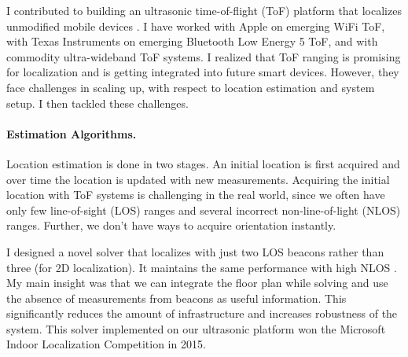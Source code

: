 \documentclass[10pt]{article}
\begin{document}
I contributed to building an ultrasonic time-of-flight (ToF) platform that localizes unmodified mobile devices \cite{rtas-alps-platform, lazik2015alps,lazik2015alpsdemo}.  I have worked with Apple on emerging WiFi ToF, with Texas Instruments on emerging Bluetooth Low Energy 5 ToF, and with commodity ultra-wideband ToF systems. I realized that ToF ranging is promising for localization and is getting integrated into future smart devices.  However, they face challenges in scaling up, with respect to location estimation and system setup. I then tackled these challenges. 


\paragraph{Estimation Algorithms. } 
Location estimation is done in two stages. An initial location is first acquired and over time the location is updated with new measurements. 
Acquiring the initial location with ToF systems is challenging in the real world, since we often have only few line-of-sight (LOS) ranges and several incorrect non-line-of-light (NLOS) ranges. Further, we don't have ways to acquire orientation instantly. 

I designed a novel solver that localizes with just two LOS beacons rather than three (for 2D localization). It maintains the same performance with high NLOS \cite{rajagopal2018enhancing}.  %
My main insight was that we can integrate the floor plan while solving and use the absence of measurements from beacons as useful information. 
This significantly reduces the amount of infrastructure and increases robustness of the system. 
This solver implemented on our ultrasonic platform won the Microsoft Indoor Localization Competition in 2015. %
\end{document}
